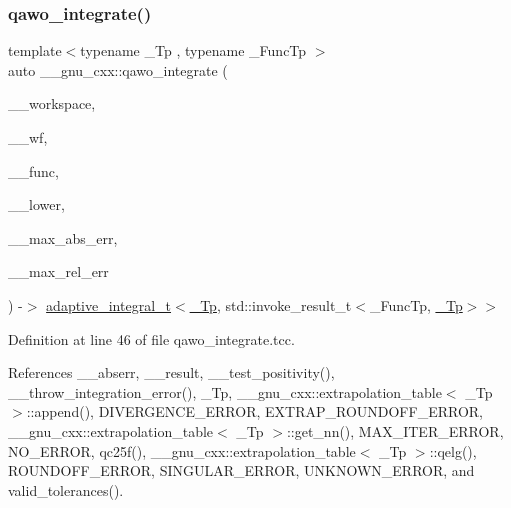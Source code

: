 \subsubsection{\texorpdfstring{qawo\+\_\+integrate()}{qawo\_integrate()}}
{\footnotesize\ttfamily template$<$typename \+\_\+\+Tp , typename \+\_\+\+Func\+Tp $>$ \\
auto \+\_\+\+\_\+gnu\+\_\+cxx\+::qawo\+\_\+integrate (\begin{DoxyParamCaption}\item[{\hyperlink{class____gnu__cxx_1_1integration__workspace}{integration\+\_\+workspace}$<$ \hyperlink{namespace____gnu__cxx_a3b19a9c800ca194374ef9172290f7d79}{\+\_\+\+Tp}, std\+::invoke\+\_\+result\+\_\+t$<$ \+\_\+\+Func\+Tp, \hyperlink{namespace____gnu__cxx_a3b19a9c800ca194374ef9172290f7d79}{\+\_\+\+Tp} $>$$>$ \&}]{\+\_\+\+\_\+workspace,  }\item[{\hyperlink{struct____gnu__cxx_1_1oscillatory__integration__table}{oscillatory\+\_\+integration\+\_\+table}$<$ \hyperlink{namespace____gnu__cxx_a3b19a9c800ca194374ef9172290f7d79}{\+\_\+\+Tp} $>$ \&}]{\+\_\+\+\_\+wf,  }\item[{\+\_\+\+Func\+Tp}]{\+\_\+\+\_\+func,  }\item[{const \hyperlink{namespace____gnu__cxx_a3b19a9c800ca194374ef9172290f7d79}{\+\_\+\+Tp}}]{\+\_\+\+\_\+lower,  }\item[{const \hyperlink{namespace____gnu__cxx_a3b19a9c800ca194374ef9172290f7d79}{\+\_\+\+Tp}}]{\+\_\+\+\_\+max\+\_\+abs\+\_\+err,  }\item[{const \hyperlink{namespace____gnu__cxx_a3b19a9c800ca194374ef9172290f7d79}{\+\_\+\+Tp}}]{\+\_\+\+\_\+max\+\_\+rel\+\_\+err }\end{DoxyParamCaption}) -\/$>$ \hyperlink{struct____gnu__cxx_1_1adaptive__integral__t}{adaptive\+\_\+integral\+\_\+t}$<$\hyperlink{namespace____gnu__cxx_a3b19a9c800ca194374ef9172290f7d79}{\+\_\+\+Tp}, std\+::invoke\+\_\+result\+\_\+t$<$\+\_\+\+Func\+Tp, \hyperlink{namespace____gnu__cxx_a3b19a9c800ca194374ef9172290f7d79}{\+\_\+\+Tp}$>$$>$
    }



Definition at line 46 of file qawo\+\_\+integrate.\+tcc.



References \+\_\+\+\_\+abserr, \+\_\+\+\_\+result, \+\_\+\+\_\+test\+\_\+positivity(), \+\_\+\+\_\+throw\+\_\+integration\+\_\+error(), \+\_\+\+Tp, \+\_\+\+\_\+gnu\+\_\+cxx\+::extrapolation\+\_\+table$<$ \+\_\+\+Tp $>$\+::append(), D\+I\+V\+E\+R\+G\+E\+N\+C\+E\+\_\+\+E\+R\+R\+OR, E\+X\+T\+R\+A\+P\+\_\+\+R\+O\+U\+N\+D\+O\+F\+F\+\_\+\+E\+R\+R\+OR, \+\_\+\+\_\+gnu\+\_\+cxx\+::extrapolation\+\_\+table$<$ \+\_\+\+Tp $>$\+::get\+\_\+nn(), M\+A\+X\+\_\+\+I\+T\+E\+R\+\_\+\+E\+R\+R\+OR, N\+O\+\_\+\+E\+R\+R\+OR, qc25f(), \+\_\+\+\_\+gnu\+\_\+cxx\+::extrapolation\+\_\+table$<$ \+\_\+\+Tp $>$\+::qelg(), R\+O\+U\+N\+D\+O\+F\+F\+\_\+\+E\+R\+R\+OR, S\+I\+N\+G\+U\+L\+A\+R\+\_\+\+E\+R\+R\+OR, U\+N\+K\+N\+O\+W\+N\+\_\+\+E\+R\+R\+OR, and valid\+\_\+tolerances().



